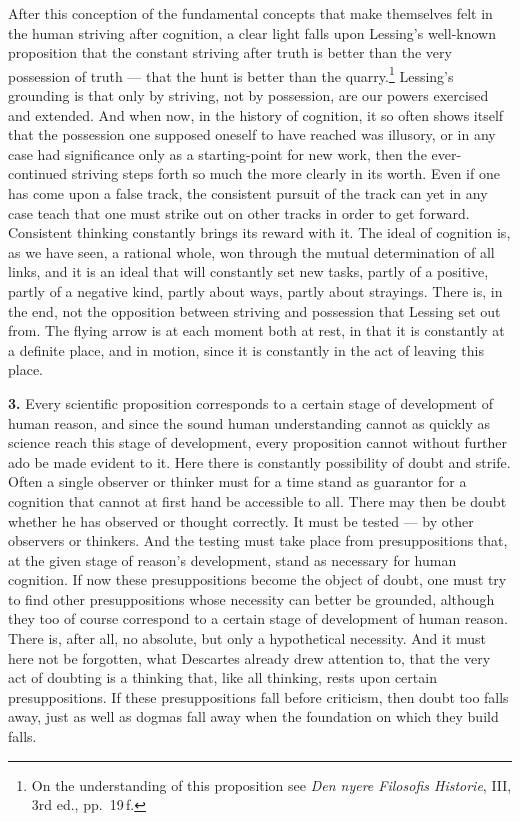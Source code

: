 \documentclass[12pt]{book}
\newcommand{\hnum}[1]{\textbf{#1.}\enspace}
\newcommand{\opage}[1]{\marginnote{\footnotesize\textit{[#1]}}}
\begin{document}
After this conception of the fundamental concepts that make themselves felt in the human striving
after cognition, a clear light falls upon Lessing's well-known proposition that the constant striving
after truth is better than the very possession of truth --- that the hunt is better than the
quarry.\footnote{On the understanding of this proposition see \textit{Den nyere Filosofis Historie},
III, 3rd ed., pp.\ 19\,f.} Lessing's grounding is that only by striving, not by possession, are our
powers exercised and extended. And when now, in the history of cognition, it so often shows itself
that the possession one supposed oneself to have reached was illusory, or in any case had significance
only as a starting-point for new work, then the ever-continued striving steps forth \opage{16}so much the more
clearly in its worth. Even if one has come upon a false track, the consistent pursuit of the track can
yet in any case teach that one must strike out on other tracks in order to get forward. Consistent
thinking constantly brings its reward with it. The ideal of cognition is, as we have seen, a rational
whole, won through the mutual determination of all links, and it is an ideal that will constantly set
new tasks, partly of a positive, partly of a negative kind, partly about ways, partly about strayings.
There is, in the end, not the opposition between striving and possession that Lessing set out from.
The flying arrow is at each moment both at rest, in that it is constantly at a definite place, and in
motion, since it is constantly in the act of leaving this place.

\hnum{3} Every scientific proposition corresponds to a certain stage of development of human reason,
and since the sound human understanding cannot as quickly as science reach this stage of development,
every proposition cannot without further ado be made evident to it. Here there is constantly
possibility of doubt and strife. Often a single observer or thinker must for a time stand as guarantor
for a cognition that cannot at first hand be accessible to all. There may then be doubt whether he has
observed or thought correctly. It must be tested --- by other observers or thinkers. And the testing
must take place from presuppositions that, at the given stage of reason's development, stand as
necessary for human cognition. If now these presuppositions become the object of doubt, one must try
to find other presuppositions whose necessity can better be grounded, although they too of course
correspond to a certain stage of development of human reason. There is, after all, no absolute, but
only a hypothetical necessity. And it must \opage{17}here not be forgotten, what Descartes already drew
attention to, that the very act of doubting is a thinking that, like all thinking, rests upon certain
presuppositions. If these presuppositions fall before criticism, then doubt too falls away, just as
well as dogmas fall away when the foundation on which they build falls.
\end{document}

